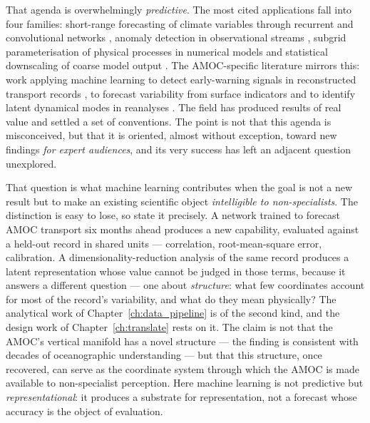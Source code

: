 That agenda is overwhelmingly \emph{predictive}. The most cited applications fall into four families: short-range forecasting of climate variables through recurrent and convolutional networks \citep{sonnewald2021, weyn2020}, anomaly detection in observational streams \citep{ham2019}, subgrid parameterisation of physical processes in numerical models \citep{rasp2018, brenowitz2020} and statistical downscaling of coarse model output \citep{vandal2019}. The AMOC-specific literature mirrors this: work applying machine learning to detect early-warning signals in reconstructed transport records \citep{boers2021, ditlevsen2023, benyami2024}, to forecast variability from surface indicators \citep{lu2024} and to identify latent dynamical modes in reanalyses \citep{sonnewald2019}. The field has produced results of real value and settled a set of conventions. The point is not that this agenda is misconceived, but that it is oriented, almost without exception, toward new findings \emph{for expert audiences}, and its very success has left an adjacent question unexplored.

That question is what machine learning contributes when the goal is not a new result but to make an existing scientific object \emph{intelligible to non-specialists}. The distinction is easy to lose, so state it precisely. A network trained to forecast AMOC transport six months ahead produces a new capability, evaluated against a held-out record in shared units --- correlation, root-mean-square error, calibration. A dimensionality-reduction analysis of the same record produces a latent representation whose value cannot be judged in those terms, because it answers a different question --- one about \emph{structure}: what few coordinates account for most of the record's variability, and what do they mean physically? The analytical work of Chapter~\ref{ch:data_pipeline} is of the second kind, and the design work of Chapter~\ref{ch:translate} rests on it. The claim is not that the AMOC's vertical manifold has a novel structure --- the finding is consistent with decades of oceanographic understanding \citep{hannachi2007, buckley2016} --- but that this structure, once recovered, can serve as the coordinate system through which the AMOC is made available to non-specialist perception. Here machine learning is not predictive but \emph{representational}: it produces a substrate for representation, not a forecast whose accuracy is the object of evaluation.

